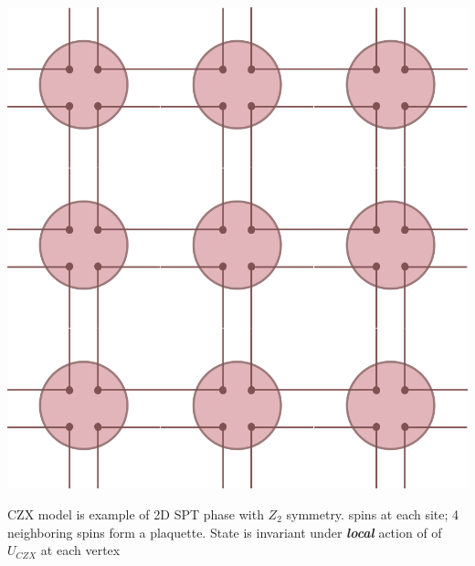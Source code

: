 \documentclass[a0,portrait]{a0poster}
\begin{document}
\begin{multicols}{3}
\begin{minipage}[m]{0.3\linewidth}
	\includegraphics[width=0.9\linewidth]{czx_3by3_lattice}
\end{minipage}
\begin{minipage}[m]{0.65\linewidth}
	CZX model \cite{Chen2011Symmetry,Chen2010Local} is example of 2D SPT phase with $ Z_2 $ symmetry.  spins at each site; 4 neighboring spins form a plaquette. \newline
	State is invariant under \emph{\textbf{local}} action of of $ U_{CZX} $ at each vertex
\end{minipage}

\vspace*{1cm}


\end{multicols}
\end{document}
